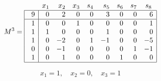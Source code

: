 {\newpage\clearpage
{}%
\begin{displaymath}
         M^3 =
         \begin{array}{|r|rrrrrrrr|}
            \multicolumn{1}{c}{\quad} & x_1 & x_2 & x_3 & s_4 & s_5 & s_6 &
                s_7 & \multicolumn{1}{c}{s_8} \\\hline
             9 & 0 & 2 & 0 & 0 & 3 & 0 & 0 & 6 \\\hline
             1 & 0 & 0 & 1 & 0 & 0 & 0 & 0 & 1 \\
             1 & 1 & 0 & 0 & 0 & 1 & 0 & 0 & 0 \\
             1 & 0 & -2 & 0 & 1 & -1 & 0 & 0 & -5 \\
             0 & 0 & -1 & 0 & 0 & 0 & 0 & 1 & -1 \\
             1 & 0 & 1 & 0 & 0 & 0 & 1 & 0 & 0 \\\hline
         \end{array}
       \end{displaymath}%
\lthtmldisplayZ
\hfill\lthtmlcheckvsize\clearpage}

{\newpage\clearpage
{}%
\begin{displaymath}
  x_1=1, \quad x_2=0, \quad x_3=1
\end{displaymath}%
\lthtmldisplayZ
\hfill\lthtmlcheckvsize\clearpage}




